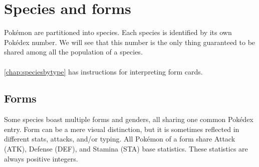 \chapter{Species and forms\label{chap:species}}
Pokémon are partitioned into species.
Each species is identified by its own Pokédex number.
We will see that this number is the only thing guaranteed to be shared among all the population of a species.\\
\\
\autoref{chap:speciesbytype} has instructions for interpreting form cards.

\section{Forms\label{sec:forms}}
Some species boast multiple forms and genders, all sharing one common Pokédex entry.
Form can be a mere visual distinction, but it is sometimes reflected in different stats,
 attacks, and/or typing.
All Pokémon of a form share Attack (ATK), Defense (DEF), and Stamina (STA) base statistics.
These statistics are always positive integers.

